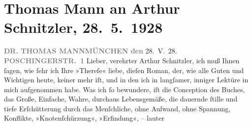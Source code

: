 

         \renewcommand{\erwaehnteOrte}{Orte: München, Poschingerstraße, Wien}
         \renewcommand{\erwaehnteWerke}{Werke: Therese. Chronik eines Frauenlebens}
               \section[Thomas Mann an Arthur Schnitzler, 28. 5. 1928]{ Thomas Mann an Arthur Schnitzler, 28. 5. 1928}\nopagebreak{}\rehead{ }\begin{ledgroupsized}[t]{13cm}\normalsize\beginnumbering \toendnotes[C]{\smallbreak\pagebreak[2]} 
\toendnotes[C]{\smallbreak}\pstart
           \noindent{}{\pb}\textcolor{gray}{\textbf{DR. THOMAS MANN}}\hfill \textcolor{gray}{\textbf{MÜNCHEN den}}{ }28. V. 28.\pend
           \pstart
           \raggedleft{}\textcolor{gray}{\textbf{POSCHINGERSTR. 1}}\pend
           \pstart{}Lieber, verehrter Arthur Schnitzler,\pend\pstart
           ich muß Ihnen ſagen, wie ſehr ich Ihre »Thereſe« liebe, dieſen Roman, der, wie alle Guten und Wichtigen heute,
                    keiner mehr iſt, und in den ich in langſamer, inniger Lektüre in mich
                    aufgenommen habe. Was ich ſo bewundere, iſt die Conception des Buches, das
                    Große, Einfache, Wahre, durchaus Lebensgemäße, die dauernde ſtille und tiefe
                    Erſchütterung durch das {\pb}Menſchliche,
                    ohne Aufwand, ohne Spannung, Konflikte, »Knotenſchürzung«, »Erfindung«, – lauter

\end{ledgroupsized}
